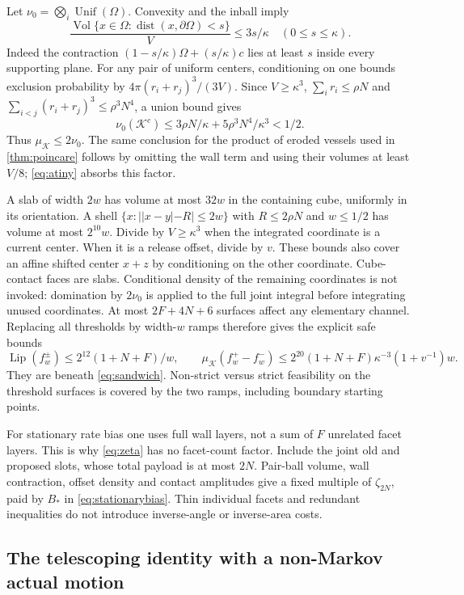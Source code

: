 \documentclass[11pt]{article}
\numberwithin{equation}{section}
\theoremstyle{definition}
\theoremstyle{remark}\newtheorem{remark}[theorem]{Remark}
\newcommand{\Lip}{\operatorname{Lip}}
\newcommand{\Vol}{\operatorname{Vol}}
\newcommand{\dist}{\operatorname{dist}}
\newcommand{\Unif}{\operatorname{Unif}}
\newcommand{\K}{\mathcal K}
\begin{document}
Let $\nu_0=\bigotimes_i\Unif(\Omega)$. Convexity and the inball imply
\[
 \frac{\Vol\{x\in\Omega:\dist(x,\partial\Omega)<s\}}V
       \le3s/\kappa\quad(0\le s\le\kappa).
\]
Indeed the contraction $(1-s/\kappa)\Omega+(s/\kappa)c$ lies at least
$s$ inside every supporting plane. For any pair of uniform centers,
conditioning on one bounds exclusion probability by
$4\pi(r_i+r_j)^3/(3V)$. Since $V\ge\kappa^3$,
$\sum_i r_i\le\rho N$ and
$\sum_{i<j}(r_i+r_j)^3\le\rho^3N^4$, a union bound gives
\[
 \nu_0(\K^c)\le3\rho N/\kappa+5\rho^3N^4/\kappa^3<1/2.
\]
Thus $\mu_\K\le2\nu_0$. The same conclusion for the product of eroded
vessels used in \cref{thm:poincare} follows by omitting the wall term and
using their volumes at least $V/8$; \eqref{eq:atiny} absorbs this factor.

A slab of width $2w$ has volume at most $32w$ in the containing cube,
uniformly in its orientation. A shell
$\{x:||x-y|-R|\le2w\}$ with $R\le2\rho N$ and $w\le1/2$ has
volume at most $2^{10}w$. Divide by $V\ge\kappa^3$ when the integrated
coordinate is a current center. When it is a release offset, divide by
$v$. These bounds also cover an affine shifted center $x+z$ by conditioning
on the other coordinate. Cube-contact faces are slabs. Conditional density
of the remaining coordinates is not invoked: domination by $2\nu_0$
is applied to the full joint integral before integrating unused coordinates.
At most $2F+4N+6$ surfaces affect any elementary channel. Replacing all
thresholds by width-$w$ ramps therefore gives the explicit safe bounds
\[
 \Lip(f_w^\pm)\le2^{12}(1+N+F)/w,
 \qquad
 \mu_\K(f_w^+-f_w^-)\le
 2^{20}(1+N+F)\kappa^{-3}(1+v^{-1})w.
\]
They are beneath \eqref{eq:sandwich}. Non-strict versus strict feasibility
on the threshold surfaces is covered by the two ramps, including boundary
starting points.

For stationary rate bias one uses full wall layers, not a sum of $F$
unrelated facet layers. This is why \eqref{eq:zeta} has no facet-count
factor. Include the joint old and proposed slots, whose total payload is
at most $2N$. Pair-ball volume, wall contraction, offset density and contact
amplitudes give a fixed multiple of $\zeta_{2N}$, paid by $B_*$ in
\eqref{eq:stationarybias}. Thin individual facets and redundant inequalities
do not introduce inverse-angle or inverse-area costs.

\subsection{The telescoping identity with a non-Markov actual motion}
\end{document}

